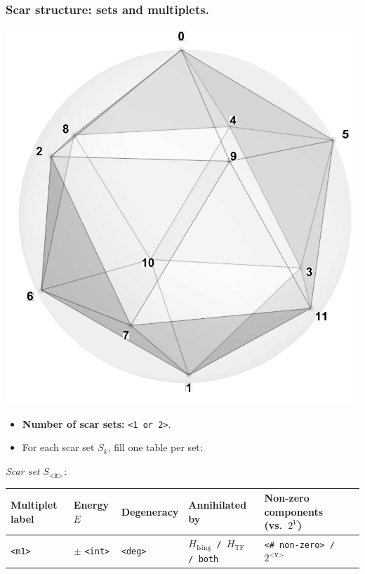 \documentclass[11pt,a4paper]{article}
\newcommand{\Hising}{H_{\mathrm{Ising}}}
\newcommand{\Htf}{H_{\mathrm{TF}}}
\begin{document}
\subsubsection*{Scar structure: sets and multiplets.}
\begin{center}
  \includegraphics[width=.6\linewidth]{icosahedron}
\end{center}

\begin{itemize}[leftmargin=1.5em]
  \item \textbf{Number of scar sets:} \texttt{<1 or 2>}. 
  \item For each scar set $S_k$, fill one table per set:
\end{itemize}

\noindent\textit{Scar set} $S_{\texttt{<k>}}$:
\begin{center}
\begin{tabular}{L{3.5cm} C{2.2cm} C{2.2cm} C{2.2cm} C{3.0cm} C{3.2cm}}
\toprule
\textbf{Multiplet label} & \textbf{Energy $E$} & \textbf{Degeneracy} & \textbf{Annihilated by} & \textbf{Non-zero components (vs.\ $2^{V}$)} \\
\midrule
\texttt{<m1>} & $\pm$ \texttt{<int>}  & \texttt{<deg> } &
\texttt{$\Hising$ / $\Htf$ / both} & \texttt{<\# non-zero> / $2^{\texttt{<V>}}$} \\
\bottomrule
\end{tabular}
\end{center}
\end{document}
